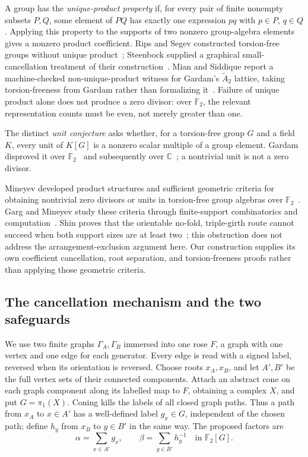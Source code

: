 \documentclass[11pt]{article}
\theoremstyle{definition}
\numberwithin{equation}{section}
\begin{document}
A group has the \emph{unique-product property} if, for every pair of finite nonempty subsets \(P,Q\), some element of \(PQ\) has exactly one expression \(pq\) with \(p\in P\), \(q\in Q\). Applying this property to the supports of two nonzero group-algebra elements gives a nonzero product coefficient. Rips and Segev constructed torsion-free groups without unique product~\cite{RipsSegev1987}; Steenbock supplied a graphical small-cancellation treatment of their construction~\cite{Steenbock2015}. Mian and Siddique report a machine-checked non-unique-product witness for Gardam's \(\widetilde A_2\) lattice, taking torsion-freeness from Gardam rather than formalizing it~\cite[Sections~1 and~7]{MianSiddique2026}. Failure of unique product alone does not produce a zero divisor: over \(\mathbb F_2\), the relevant representation counts must be even, not merely greater than one.

The distinct \emph{unit conjecture} asks whether, for a torsion-free group \(G\) and a field \(K\), every unit of \(K[G]\) is a nonzero scalar multiple of a group element. Gardam disproved it over \(\mathbb F_2\)~\cite{Gardam2021} and subsequently over \(\mathbb C\)~\cite{Gardam2024}; a nontrivial unit is not a zero divisor.

Mineyev developed product structures and sufficient geometric criteria for obtaining nontrivial zero divisors or units in torsion-free group algebras over \(\mathbb F_2\)~\cite[Theorem~27]{Mineyev2024}. Garg and Mineyev study these criteria through finite-support combinatorics and computation~\cite[Theorems~1--3 and~16]{GargMineyev2025}. Shin proves that the orientable no-fold, triple-girth route cannot succeed when both support sizes are at least two~\cite[Theorem~1.1 and Corollary~1.2]{Shin2026}; this obstruction does not address the arrangement-exclusion argument here. Our construction supplies its own coefficient cancellation, root separation, and torsion-freeness proofs rather than applying those geometric criteria.

\subsection*{The cancellation mechanism and the two safeguards}

We use two finite graphs \(\Gamma_A,\Gamma_B\) immersed into one rose \(F\), a graph with one vertex and one edge for each generator. Every edge is read with a signed label, reversed when its orientation is reversed. Choose roots \(x_A,x_B\), and let \(A',B'\) be the full vertex sets of their connected components. Attach an abstract cone on each graph component along its labelled map to \(F\), obtaining a complex \(X\), and put \(G=\pi_1(X)\). Coning kills the labels of all closed graph paths. Thus a path from \(x_A\) to \(x\in A'\) has a well-defined label \(g_x\in G\), independent of the chosen path; define \(h_y\) from \(x_B\) to \(y\in B'\) in the same way. The proposed factors are
\begin{equation}\label{eq:overview-factors}
 \alpha=\sum_{x\in A'}g_x,\qquad
 \beta=\sum_{y\in B'}h_y^{-1}\quad\text{in }\mathbb F_2[G].
\end{equation}
\end{document}

